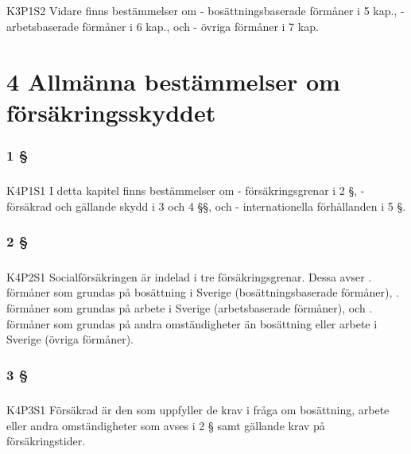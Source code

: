 \documentclass[a4paper,notitlepage,openany,10pt]{book}
\begin{document}
\paragraph*{}
{\tiny K3P1S2}
Vidare finns bestämmelser om
\newline - bosättningsbaserade förmåner i 5 kap.,
\newline - arbetsbaserade förmåner i 6 kap., och
\newline - övriga förmåner i 7 kap.
\chapter*{4 Allmänna bestämmelser om försäkringsskyddet}
\subsection*{1 §}
\paragraph*{}
{\tiny K4P1S1}
I detta kapitel finns bestämmelser om
\newline - försäkringsgrenar i 2 §,
\newline - försäkrad och gällande skydd i 3 och 4 §§, och
\newline - internationella förhållanden i 5 §.
\subsection*{2 §}
\paragraph*{}
{\tiny K4P2S1}
Socialförsäkringen är indelad i tre försäkringsgrenar.
Dessa avser
. förmåner som grundas på bosättning i Sverige (bosättningsbaserade förmåner),
. förmåner som grundas på arbete i Sverige (arbetsbaserade förmåner), och
. förmåner som grundas på andra omständigheter än bosättning eller arbete i Sverige (övriga förmåner).
\subsection*{3 §}
\paragraph*{}
{\tiny K4P3S1}
Försäkrad är den som uppfyller de krav i fråga om bosättning, arbete eller andra omständigheter som avses i 2 § samt gällande krav på försäkringstider.
\end{document}
